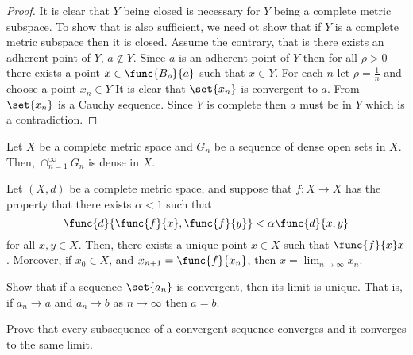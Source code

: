 \begin{proof}
    It is clear that \(Y\) being closed is necessary for \(Y\) being a complete metric subspace. To show that is also sufficient, we need ot show that if \(Y\) is a complete metric subspace then it is closed. Assume the contrary, that is there exists an adherent point of \(Y\), \(a \notin Y\). Since \(a\) is an adherent point of \(Y\) then for all \(\rho > 0\) there exists a point \(x \in \func{B_\rho}{a}\) such that \(x \in Y\). For each \(n\) let \(\rho = \frac{1}{n}\) and choose a point \(x_n \in Y\)
    It is clear that \(\set{ x_n }\) is convergent to \(a\). From  \(\set{ x_n }\) is a Cauchy sequence. Since \(Y\) is complete then \(a\) must be in \(Y\) which is a contradiction.
\end{proof}

\begin{theorem}
    Let \(X\) be a complete metric space and \(G_n\) be a sequence of dense open sets in \(X\). Then, \(\cap_{n = 1}^{\infty} G_n\) is dense in \(X\).
\end{theorem}

\begin{theorem}
    Let \((X,d)\) be a complete metric space, and suppose that \(f:X \to X\) has the property that there exists \(\alpha < 1 \) such that
    \begin{equation*}
        \func{d}{\func{f}{x}, \func{f}{y}} < \alpha \func{d}{x,y}
    \end{equation*}
    for all \(x,y \in X\). Then, there exists a unique point \(x \in X\) such that \(\func{f}{x} x\). Moreover, if \(x_0 \in X\), and \(x_{n+1} = \func{f}{x_n}\), then \(x = \lim_{n \to \infty} x_n\).
\end{theorem}
\begin{exercise}
    \item Show that if a sequence \(\set{ a_n }\) is convergent, then its limit is unique. That is, if \(a_n \to a \) and \(a_n \to b\) as \(n \to \infty\) then \(a = b\).
    \item Prove that every subsequence of a convergent sequence converges and it converges to the same limit.
\end{exercise}
\newpage

